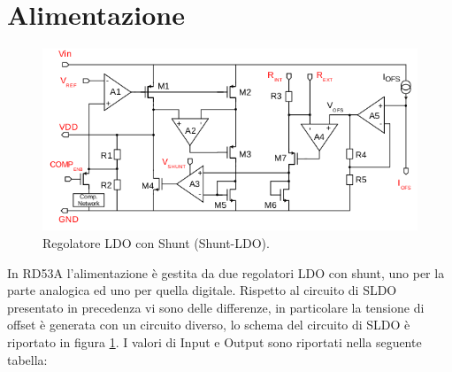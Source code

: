 \section{Alimentazione}
\begin{figure}
\centering
\includegraphics[width=\textwidth]{Immagini/SLDO_RD53A}
\caption{Regolatore LDO con Shunt (Shunt-LDO).}
\label{SLDO_RD53A}
\end{figure}
In RD53A l'alimentazione è gestita da due regolatori LDO con shunt, uno per la parte analogica ed uno per quella digitale. 
Rispetto al circuito di SLDO presentato in precedenza vi sono delle differenze, in particolare la tensione di offset è generata con un circuito diverso, lo schema del circuito di SLDO è riportato in  figura \ref{SLDO_RD53A}. 
I valori di Input e Output sono riportati nella seguente tabella:

